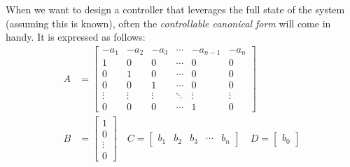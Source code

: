 When we want to design a controller that leverages the full state of the system (assuming this is known), often the \textit{controllable canonical form} will come in handy. It is expressed as follows:
%
\begin{subequations}
	\begin{align}
	A &= \begin{bmatrix} -a_1 & -a_2 & -a_3 & \cdots & -a_{n-1} & -a_n \\
	1 & 0 & 0 & \cdots & 0 & 0 \\
	0 & 1 & 0 & \cdots & 0 & 0 \\
	0 & 0 & 1 & \cdots & 0 & 0 \\
	\vdots & \vdots & \vdots &\ddots & \vdots & \vdots \\
	0 & 0 & 0 & \cdots & 1 & 0 
	\end{bmatrix} 
	\\
		B &= \begin{bmatrix} 1 \\ 0 \\ \vdots \\ 0 \end{bmatrix}
	\quad
	C = \begin{bmatrix} b_1 & b_2 & b_3 & \cdots & b_n \end{bmatrix}
	\quad 
	D = \begin{bmatrix} b_0 \end{bmatrix}
	\end{align}
\end{subequations}

